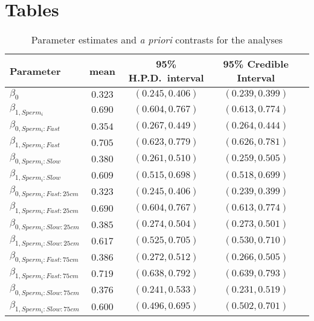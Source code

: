 \documentclass{article}
\begin{document}
\newpage{}



	 \section{Tables}
	 \renewcommand{\thetable}{\arabic{table}}
	 \setcounter{table}{0}

	\begin{table}[!ht]
	\caption{Parameter estimates and \textit{a priori} contrasts for the  analyses}
	\label{Table:ModelResults}
	\centering
	\begin{tabular}{l c c c c} 
	\hline
	Parameter & mean & 95\% H.P.D.~interval & 95\% Credible Interval \\
	\hline
     $\beta_{0}$                 &  $0.323$ &  $(0.245, 0.406)$ &  $(0.239, 0.399)$ \\
     $\beta_{1,Sperm_i}$         &  $0.690$ &  $(0.604, 0.767)$ &  $(0.613, 0.774)$ \\
     $\beta_{0,Sperm_i:Fast}$    &  $0.354$ &  $(0.267, 0.449)$ &  $(0.264, 0.444)$ \\
     $\beta_{1,Sperm_i:Fast}$    &  $0.705$ &  $(0.623, 0.779)$ &  $(0.626, 0.781)$ \\
     $\beta_{0,Sperm_i:Slow}$    &  $0.380$ &  $(0.261, 0.510)$ &  $(0.259, 0.505)$ \\
     $\beta_{1,Sperm_i:Slow}$    &  $0.609$ &  $(0.515, 0.698)$ &  $(0.518, 0.699)$ \\
     $\beta_{0,Sperm_i:Fast:25cm}$  &  $0.323$ &  $(0.245, 0.406)$ &  $(0.239, 0.399)$ \\
     $\beta_{1,Sperm_i:Fast:25cm}$  &  $0.690$ &  $(0.604, 0.767)$ &  $(0.613, 0.774)$ \\
     $\beta_{0,Sperm_i:Slow:25cm}$  &  $0.385$ &  $(0.274, 0.504)$ &  $(0.273, 0.501)$ \\
     $\beta_{1,Sperm_i:Slow:25cm}$  &  $0.617$ &  $(0.525, 0.705)$ &  $(0.530, 0.710)$ \\
     $\beta_{0,Sperm_i:Fast:75cm}$ &  $0.386$ &  $(0.272, 0.512)$ &  $(0.266, 0.505)$ \\
     $\beta_{1,Sperm_i:Fast:75cm}$ &  $0.719$ &  $(0.638, 0.792)$ &  $(0.639, 0.793)$ \\
     $\beta_{0,Sperm_i:Slow:75cm}$ &  $0.376$ &  $(0.241, 0.533)$ &  $(0.231, 0.519)$ \\
     $\beta_{1,Sperm_i:Slow:75cm}$ &  $0.600$ &  $(0.496, 0.695)$ &  $(0.502, 0.701)$ \\

\end{tabular}
\end{table}
\end{document}
